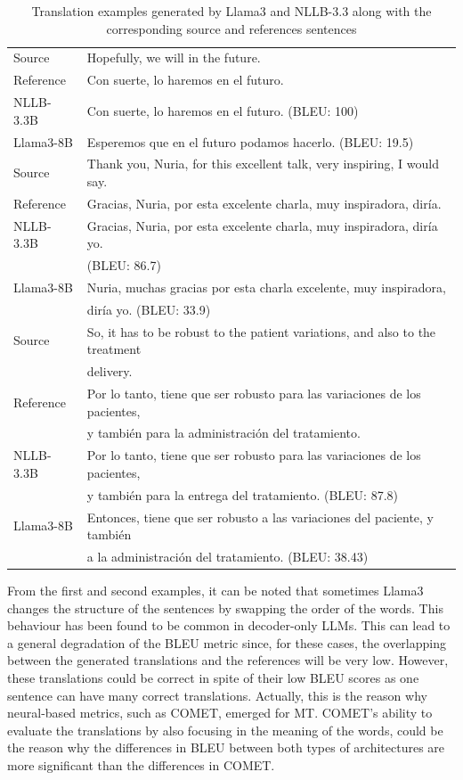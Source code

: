\documentclass[11pt,english,listoffigures,listoftables]{tfgetsinf}
\begin{document}
\begin{table}[h]
    \centering
    \caption{Translation examples generated by Llama3 and NLLB-3.3 along with the corresponding source and references sentences}
    \label{tab:comparison_translations}
    \begin{tabular}{l l}
        \toprule
         Source & Hopefully, we will in the future. \\
         Reference & Con suerte, lo haremos en el futuro. \\
         NLLB-3.3B & Con suerte, lo haremos en el futuro. (BLEU: 100)\\
         Llama3-8B & Esperemos que en el futuro podamos hacerlo. (BLEU: 19.5) \\
         \midrule
         Source & Thank you, Nuria, for this excellent talk, very inspiring, I would say. \\
         Reference & Gracias, Nuria, por esta excelente charla, muy inspiradora, diría.  \\
         NLLB-3.3B & Gracias, Nuria, por esta excelente charla, muy inspiradora, diría yo. \\ & (BLEU: 86.7) \\
         Llama3-8B & Nuria, muchas gracias por esta charla excelente, muy inspiradora, \\ & diría yo. (BLEU: 33.9) \\
         \midrule
         Source & So, it has to be robust to the patient variations, and also to the treatment \\ & delivery. \\
         Reference & Por lo tanto, tiene que ser robusto para las variaciones de los pacientes, \\ & y también para la administración del tratamiento. \\
         NLLB-3.3B & Por lo tanto, tiene que ser robusto para las variaciones de los pacientes, \\ & y también para la entrega del tratamiento. (BLEU: 87.8) \\
         Llama3-8B & Entonces, tiene que ser robusto a las variaciones del paciente, y también \\ & a la administración del tratamiento. (BLEU: 38.43) \\
         \bottomrule
    \end{tabular}
\end{table}

From the first and second examples, it can be noted that sometimes Llama3 changes the structure of the sentences by swapping the order of the words. This behaviour has been found to be common in decoder-only LLMs. This can lead to a general degradation of the BLEU metric since, for these cases, the overlapping between the generated translations and the references will be very low. However, these translations could be correct in spite of their low BLEU scores as one sentence can have many correct translations. Actually, this is the reason why neural-based metrics, such as COMET, emerged for MT. COMET's ability to evaluate the translations by also focusing in the meaning of the words, could be the reason why the differences in BLEU between both types of architectures are more significant than the differences in COMET. 
\end{document}

